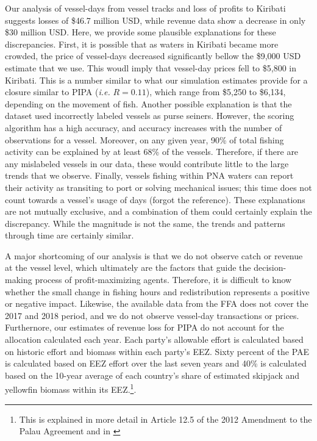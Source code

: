 \documentclass[9p,twocolumn,twoside,lineno]{pnas-new}
\begin{document}
Our analysis of vessel-days from vessel tracks and loss of profits to Kiribati suggests losses of \$46.7 million USD, while revenue data show a decrease in only \$30 million USD. Here, we provide some plausible explanations for these discrepancies. First, it is possible that as waters in Kiribati became more crowded, the price of vessel-days decreased significantly bellow the \$9,000 USD estimate that we use. This woudl imply that vessel-day prices fell to \$5,800 in Kiribati. This is a number similar to what our simulation estimates provide for a closure similar to PIPA (\emph{i.e.} $R = 0.11$), which range from \$5,250 to \$6,134, depending on the movement of fish. Another possible explanation is that the dataset used incorrectly labeled vessels as purse seiners. However, the scoring algorithm has a high accuracy, and accuracy increases with the number of observations for a vessel. Moreover, on any given year, 90\% of total fishing activity can be explained by at least 68\% of the vessels. Therefore, if there are any mislabeled vessels in our data, these would contribute little to the large trends that we observe. Finally, vessels fishing within PNA waters can report their activity as transiting to port or solving mechanical issues; this time does not count towards a vessel's usage of days (forgot the reference). These explanations are not mutually exclusive, and a combination of them could certainly explain the discrepancy. While the magnitude is not the same, the trends and patterns through time are certainly similar.

A major shortcoming of our analysis is that we do not observe catch or revenue at the vessel level, which ultimately are the factors that guide the decision-making process of profit-maximizing agents. Therefore, it is difficult to know whether the small change in fishing hours and redistribution represents a positive or negative impact. Likewise, the available data from the FFA does not cover the 2017 and 2018 period, and we do not observe vessel-day transactions or prices. Furthernore, our estimates of revenue loss for PIPA do not account for the allocation calculated each year. Each party’s allowable effort is calculated based on historic effort and biomass within each party’s EEZ. Sixty percent of the PAE is calculated based on EEZ effort over the last seven years and 40\% is calculated based on the 10-year average of each country’s share of estimated skipjack and yellowfin biomass within its EEZ.\footnote{This is explained in more detail in Article 12.5 of the 2012 Amendment to the Palau Agreement and in \cite{Hagrannsoknir2014}}.
\end{document}
